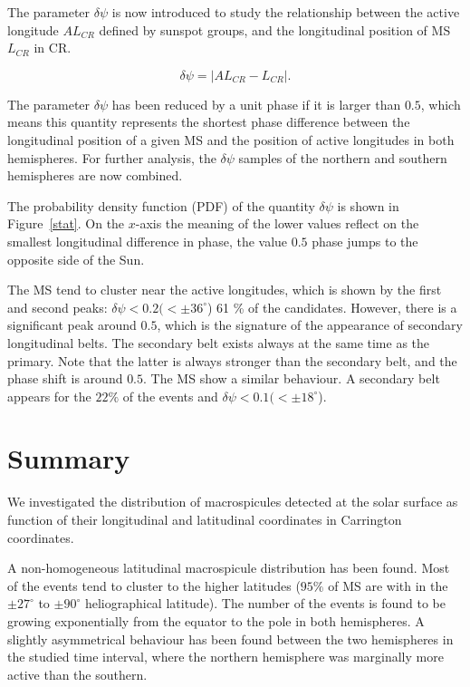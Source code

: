 The parameter $\delta\psi$ is now introduced to study the relationship between the active longitude  $AL_{CR}$ defined by sunspot groups, and the longitudinal position of MS $L_{CR}$ in CR. 

\begin{equation}
\delta\psi = \left| AL_{CR} - L_{CR}\right|.
\end{equation}

The parameter $\delta\psi$ has been reduced by a unit phase if it is larger than $0.5$, which means this quantity represents the shortest phase difference between the longitudinal position of a given MS and the position of active longitudes in both hemispheres. For further analysis, the $\delta\psi$ samples of the northern and southern hemispheres are now combined. 

The probability density function (PDF) of the quantity $\delta\psi$ is shown in Figure~\ref{stat}. On the $x$-axis the meaning of the lower values reflect on the smallest longitudinal difference in phase, the value $0.5$ phase jumps to the opposite side of the Sun.

The MS tend to cluster near the active longitudes, which is shown by the first and second peaks: $\delta\psi< 0.2 (<\pm 36^{\circ}$) 61 \% of the candidates. However, there is a significant peak around $0.5$, which is the signature of the appearance of secondary longitudinal belts. The secondary belt exists always at the same time as the primary. Note that the latter is always stronger than the secondary belt, and the phase shift is around $0.5$. The MS show a similar behaviour. A secondary belt appears for the $22\%$ of the events and $\delta\psi< 0.1 (<\pm 18^{\circ}$).

\section{Summary}
We investigated the distribution of macrospicules detected at the solar surface as function of their longitudinal and latitudinal coordinates in Carrington coordinates.

A non-homogeneous latitudinal macrospicule distribution has been found. Most of the events tend to cluster to the higher latitudes ($95\%$ of MS are with in the $\pm27^{\circ}$ to $\pm90^{\circ}$ heliographical latitude). The number of the events is found to be growing exponentially from the equator to the pole in both hemispheres. A slightly asymmetrical behaviour has been found between the two hemispheres in the studied time interval, where the northern hemisphere was marginally more active than the southern. 

